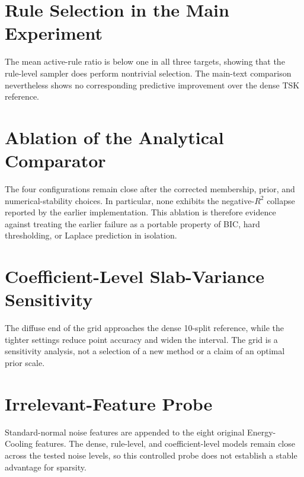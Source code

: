 \documentclass[1p,times]{elsarticle}
\begin{document}
\FloatBarrier

\section{Rule Selection in the Main Experiment}



The mean active-rule ratio is below one in all three targets, showing that
the rule-level sampler does perform nontrivial selection.  The main-text
comparison nevertheless shows no corresponding predictive improvement over
the dense TSK reference.

\FloatBarrier

\section{Ablation of the Analytical Comparator}



The four configurations remain close after the corrected membership,
prior, and numerical-stability choices.  In particular, none exhibits the
negative-$R^2$ collapse reported by the earlier implementation.  This
ablation is therefore evidence against treating the earlier failure as a
portable property of BIC, hard thresholding, or Laplace prediction in
isolation.

\FloatBarrier

\section{Coefficient-Level Slab-Variance Sensitivity}



The diffuse end of the grid approaches the dense 10-split reference, while
the tighter settings reduce point accuracy and widen the interval.  The
grid is a sensitivity analysis, not a selection of a new method or a
claim of an optimal prior scale.

\FloatBarrier

\section{Irrelevant-Feature Probe}



Standard-normal noise features are appended to the eight original
Energy-Cooling features.  The dense, rule-level, and coefficient-level
models remain close across the tested noise levels, so this controlled
probe does not establish a stable advantage for sparsity.
\end{document}
